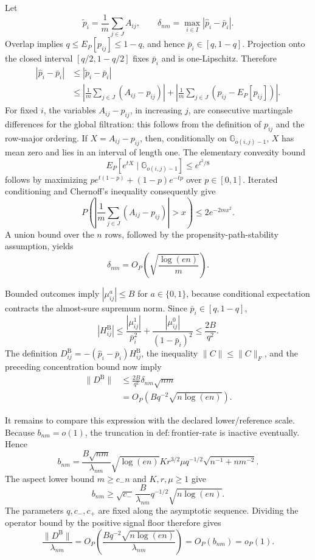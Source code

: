 Let
\[
 \widetilde p_i=\frac1m\sum_{j\in J}A_{ij},\qquad
 \delta_{nm}=\max_{i\in I}|\widehat p_i-\bar p_i|.
\]
Overlap implies \(q\le E_P[p_{ij}]\le1-q\), and hence \(\bar p_i\in[q,1-q]\).  Projection onto the closed interval \([q/2,1-q/2]\) fixes \(\bar p_i\) and is one-Lipschitz.  Therefore
\[
 \begin{aligned}
 |\widehat p_i-\bar p_i|
 &\le |\widetilde p_i-\bar p_i|\\
 &\le \left|\frac1m\sum_{j\in J}(A_{ij}-p_{ij})\right|
 +\left|\frac1m\sum_{j\in J}(p_{ij}-E_P[p_{ij}])\right|.
 \end{aligned}
\]
For fixed \(i\), the variables \(A_{ij}-p_{ij}\), in increasing \(j\), are consecutive martingale differences for the global filtration: this follows from the definition of \(p_{ij}\) and the row-major ordering.  If \(X=A_{ij}-p_{ij}\), then, conditionally on \(\mathbb G_{o(i,j)-1}\), \(X\) has mean zero and lies in an interval of length one.  The elementary convexity bound
\[
 E_P[e^{tX}\mid\mathbb G_{o(i,j)-1}]\le e^{t^2/8}
\]
follows by maximizing \(p e^{t(1-p)}+(1-p)e^{-tp}\) over \(p\in[0,1]\).  Iterated conditioning and Chernoff's inequality consequently give
\[
 P\!\left(\left|\frac1m\sum_{j\in J}(A_{ij}-p_{ij})\right|>x\right)
 \le 2e^{-2mx^2}.
\]
A union bound over the \(n\) rows, followed by the propensity-path-stability assumption, yields
\[
 \delta_{nm}=O_P\!\left(\sqrt{\frac{\log(en)}m}\right).
\]

Bounded outcomes imply \(|\mu^a_{ij}|\le B\) for \(a\in\{0,1\}\), because conditional expectation contracts the almost-sure supremum norm.  Since \(\bar p_i\in[q,1-q]\),
\[
 |H^{\mathrm B}_{ij}|
 \le \frac{|\mu^1_{ij}|}{\bar p_i^2}
      +\frac{|\mu^0_{ij}|}{(1-\bar p_i)^2}
 \le \frac{2B}{q^2}.
\]
The definition \(D^{\mathrm B}_{ij}=-(\widehat p_i-\bar p_i)H^{\mathrm B}_{ij}\), the inequality \(\lVert C\rVert\le\lVert C\rVert_F\), and the preceding concentration bound now imply
\[
 \begin{aligned}
 \lVert D^{\mathrm B}\rVert
 &\le \frac{2B}{q^2}\delta_{nm}\sqrt{nm}\\
 &=O_P\!\left(Bq^{-2}\sqrt{n\log(en)}\right).
 \end{aligned}
\]

It remains to compare this expression with the declared lower/reference scale.  Because \(b_{nm}=o(1)\), the truncation in \(\mathrm{def:frontier\mbox{-}rate}\) is inactive eventually.  Hence
\[
 b_{nm}=\frac{B\sqrt{nm}}{\lambda_{nm}}\sqrt{\log(en)}
 K r^{3/2}\mu q^{-1/2}\sqrt{n^{-1}+nm^{-2}}.
\]
The aspect lower bound \(m\ge c_-n\) and \(K,r,\mu\ge1\) give
\[
 b_{nm}\ge
 \sqrt{c_-}\,\frac{B}{\lambda_{nm}}q^{-1/2}
 \sqrt{n\log(en)}.
\]
The parameters \(q,c_-,c_+\) are fixed along the asymptotic sequence.  Dividing the operator bound by the positive signal floor therefore gives
\[
 \frac{\lVert D^{\mathrm B}\rVert}{\lambda_{nm}}
 =O_P\!\left(\frac{Bq^{-2}\sqrt{n\log(en)}}{\lambda_{nm}}\right)
 =O_P(b_{nm})=o_P(1).
\]

